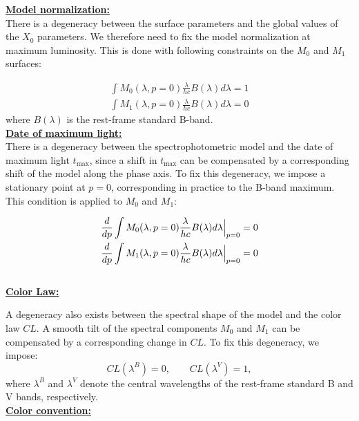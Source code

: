 \noindent \textbf{\underline{Model normalization:}} \\

There is a degeneracy 
between the surface parameters and the global values of the $X_0$ 
parameters. We therefore need to fix the model normalization at 
maximum luminosity. This is done with following constraints on the $M_0$ and $M_1$ 
surfaces:

\begin{align}
    \int M_0(\lambda,p=0)\frac{\lambda}{hc}B(\lambda) d\lambda = 1 \label{eqn:M0norm}\\
    \int M_1(\lambda,p=0)\frac{\lambda}{hc}B(\lambda) d\lambda = 0
\end{align}
where $B(\lambda)$ is the rest-frame standard B-band.\\


\noindent \textbf{\underline{Date of maximum light:}} \\

There is a degeneracy between the spectrophotometric model and the date of maximum light $t_{\max}$, since a shift in $t_{\max}$ can be compensated by a 
corresponding shift of the model along the phase axis. 
To fix this degeneracy, 
we impose a stationary point at $p=0$, corresponding in practice to the B-band maximum. 
This condition is applied to $M_0$ and $M_1$:

\begin{align}
    \frac{d}{dp} \int M_0(\lambda,p=0)\frac{\lambda}{hc}B(\lambda)d\lambda \Big{|}_{p=0} = 0 \\
    \frac{d}{dp} \int M_1(\lambda,p=0)\frac{\lambda}{hc}B(\lambda)d\lambda \Big{|}_{p=0} = 0
\end{align}
\\

\noindent \textbf{\underline{Color Law:}} \

A degeneracy also exists between the spectral shape of the model and the color law $CL$. A smooth tilt of the spectral components $M_0$ and $M_1$ can be 
compensated by a corresponding change in $CL$. To fix this degeneracy, we impose:
\begin{equation}
CL(\lambda^B) = 0, \qquad CL(\lambda^V) = 1,
\end{equation}
where $\lambda^B$ and $\lambda^V$ denote the central wavelengths of the rest-frame standard B and V bands, respectively. \\


\noindent \textbf{\underline{Color convention:}} \\

